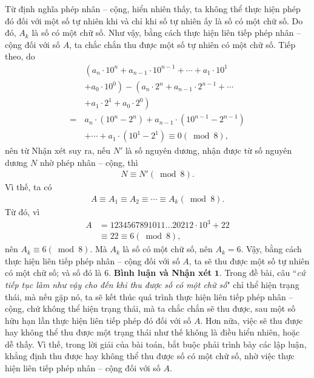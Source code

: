 \begin{multicols}{2}
	Từ định nghĩa phép nhân -- cộng, hiển nhiên thấy, ta không thể thực hiện phép đó đối với một số tự nhiên khi và chỉ khi số tự nhiên ấy là số có một chữ số. Do đó, $A_k$  là số có một chữ số.
	\vskip 0.01cm
	Như vậy, bằng cách thực hiện liên tiếp phép nhân -- cộng đối với số $A$, ta chắc chắn thu được một số tự nhiên có một chữ số.
	\vskip 0.01cm
	Tiếp theo, do
	\begin{align*}
			&\left({a_n} \cdot {{10}^n} + {a_{n - 1}} \cdot {{10}^{n - 1}} +  \cdots  + {a_1} \cdot {{10}^1}\right. \\[-0.4ex]
			&\left.+ {a_0} \cdot {{10}^0} \right) - \left( {a_n} \cdot {2^n} + {a_{n - 1}} \cdot {2^{n - 1}} +  \cdots\right. \\[-0.4ex]
			&\left.+ {a_1} \cdot {2^1} + {a_0} \cdot {2^0} \right)\\[-0.4ex]
			=\, &{a_n} \cdot \left( {{{10}^n} - {2^n}} \right) + {a_{n - 1}} \cdot \left( {{{10}^{n - 1}} - {2^{n - 1}}} \right) \\[-0.4ex]
			&+  \cdots + {a_1} \cdot \left( {{{10}^1} - {2^1}} \right) \equiv 0\left( {\bmod 8} \right),
	\end{align*}
	nên từ Nhận xét suy ra, nếu  $N'$ là số nguyên dương, nhận được từ số nguyên dương $N$ nhờ phép nhân -- cộng, thì
	\begin{align*}
		N \equiv N'\left( {\bmod 8} \right).
	\end{align*}
	Vì thế, ta có
	\begin{align*}
		A \equiv {A_1} \equiv {A_2} \equiv  \cdots  \equiv {A_k}\left( {\bmod 8} \right).
	\end{align*}
	Từ đó, vì
	\begin{align*}
		A &= 1234567891011 \ldots 20212 \cdot {10^3} + 22 \\[-0.4ex]
		&\equiv 22 \equiv 6\left( {\bmod 8} \right),
	\end{align*}
	nên ${A_k} \equiv 6\left( {\bmod 8} \right)$.  Mà  $A_k$ là số có một chữ số, nên $A_k = 6$.
	\vskip 0.05cm 
	Vậy, bằng cách thực hiện liên tiếp phép nhân -- cộng đối với số $A$, ta sẽ thu được một số tự nhiên có một chữ số; và số đó là $6$.
	\vskip 0.05cm
	\textbf{\color{thachthuctoanhoc}Bình luận và Nhận xét}
	\vskip 0.05cm
	$\pmb{1.}$ Trong đề bài, câu ``\textit{cứ tiếp tục làm như vậy cho đến khi thu được số có một chữ số}" chỉ thể hiện trạng thái, mà nếu gặp nó, ta sẽ kết thúc quá trình thực hiện liên tiếp phép nhân -- cộng, chứ không thể hiện trạng thái, mà ta chắc chắn sẽ thu được, sau một số hữu hạn lần thực hiện liên tiếp phép đó đối với số $A$. Hơn nữa, việc sẽ thu được hay không thể thu được một trạng thái như thế không là điều hiển nhiên, hoặc dễ thấy. Vì thế, trong lời giải của bài toán, bắt buộc phải trình bày các lập luận, khẳng định thu được hay không thể thu được số có một chữ số, nhờ việc thực hiện liên tiếp phép nhân -- cộng đối với số $A$.

\end{multicols}
